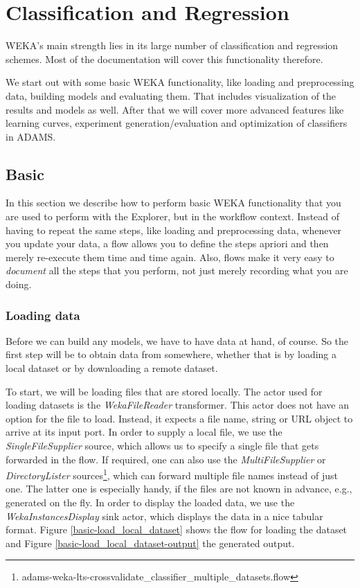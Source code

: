 
\chapter{Classification and Regression}
\label{classification_and_regression}
WEKA's main strength lies in its large number of classification and regression
schemes. Most of the documentation will cover this functionality therefore.

We start out with some basic WEKA functionality, like loading and
preprocessing data, building models and evaluating them. That includes
visualization of the results and models as well. After that we will cover more
advanced features like learning
curves, experiment generation/evaluation and optimization of classifiers in ADAMS.

\newpage
\section{Basic}
In this section we describe how to perform basic WEKA functionality that you are
used to perform with the Explorer, but in the workflow context. Instead of
having to repeat the same steps, like loading and preprocessing data, whenever
you update your data, a flow allows you to define the steps apriori and then merely
re-execute them time and time again. Also, flows make it very easy to
\textit{document} all the steps that you perform, not just merely recording what
you are doing.

\subsection{Loading data}
Before we can build any models, we have to have data at hand, of course. So the
first step will be to obtain data from somewhere, whether that is by loading a
local dataset or by downloading a remote dataset.

To start, we will be loading files that are stored locally. The actor used for
loading datasets is the \textit{WekaFileReader} transformer. This actor does not
have an option for the file to load. Instead, it expects a file name, string or
URL object to arrive at its input port. In order to supply a local file, we use
the \textit{SingleFileSupplier} source, which allows us to specify a single file
that gets forwarded in the flow. If required, one can also use the
\textit{MultiFileSupplier} or \textit{DirectoryLister}
sources\footnote{adams-weka-lts-crossvalidate\_classifier\_multiple\_datasets.flow},
which can forward multiple file names instead of just one. The latter one is
especially handy, if the files are not known in advance, e.g., generated on the
fly. In order to display the loaded data, we use the
\textit{WekaInstancesDisplay} sink actor, which displays the data in a nice
tabular format. Figure \ref{basic-load_local_dataset} shows the flow for loading
the dataset and Figure \ref{basic-load_local_dataset-output} the generated
output.


